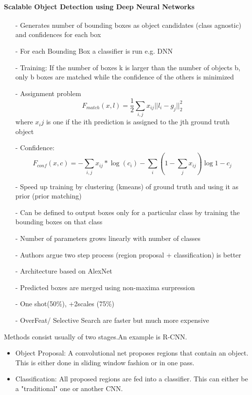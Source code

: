 			\paragraph{Scalable Object Detection using Deep Neural Networks\cite{Erhan}}
			\begin{itemize}
				\item[-] Generates number of bounding boxes as object candidates (class agnostic) and confidences for each box
				\item[-] For each Bounding Box a classifier is run e.g. DNN
				\item[-] Training: If the number of boxes k is larger than the number of objects b, only b boxes are matched while the confidence of the others is minimized
				\item[-] Assignment problem $$F_{match}(x,l) = \frac{1}{2}\sum_{i,j}x_{ij}||l_i - g_j||^2_2$$ where $x_ij$ is one if the ith prediction is assigned to the jth ground truth object
				\item[-] Confidence: 
				$$F_{conf}(x,c) = - \sum_{i,j}x_{ij}*\log(c_i)-\sum_{i}(1-\sum_{j}x_{ij})\log{1-c_j}$$
				\item[-] Speed up training by clustering (kmeans) of ground truth and using it as prior (prior matching)
				\item[-] Can be defined to output boxes only for a particular class by training the bounding boxes on that class
				\item[-] Number of parameters grows linearly with number of classes
				\item[-] Authors argue two step process (region proposal + classification) is better
				\item[-] Architecture based on AlexNet
				\item[-] Predicted boxes are merged using non-maxima surpression
				\item[-] One shot(50\%), +2scales (75\%)
				\item[-] OverFeat/ Selective Search are faster but much more expensive
			\end{itemize}
			
	
	Methods consist usually of two stages.An example is R-CNN\cite{Ren}. 
	\begin{itemize}
		\item Object Proposal: A convolutional net proposes regions that contain an object. This is either done in sliding window fashion or in one pass.
		\item Classification: All proposed regions are fed into a classifier. This can either be a "traditional" one or another CNN.
	\end{itemize}

